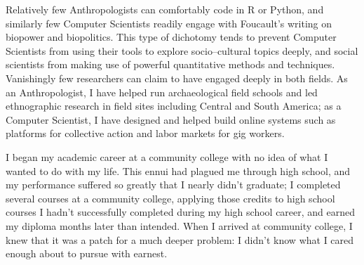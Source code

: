 \documentclass[12pt]{article}
\begin{document}




Relatively few Anthropologists can comfortably code in R or Python,
and similarly few Computer Scientists readily engage with Foucault's writing on biopower and biopolitics.
This type of dichotomy tends to prevent Computer Scientists from using their tools to explore socio--cultural topics deeply,
and social scientists from making use of powerful quantitative methods and techniques.
Vanishingly few researchers can claim to have engaged deeply in both fields.
As an Anthropologist, I have helped run archaeological field schools and led ethnographic research in field sites including Central and South America;
as a Computer Scientist, I have designed and helped build online systems such as platforms for collective action and labor markets for gig workers.








I began my academic career at a community college with no idea of what I wanted to do with my life.
This ennui had plagued me through high school,
and my performance suffered so greatly that I nearly didn't graduate;
I completed several courses at a community college,
applying those credits to high school courses I hadn't successfully completed during my high school career,
and earned my diploma months later than intended.
When I arrived at community college,
I knew that it was a patch for a much deeper problem:
I didn't know what I cared enough about to pursue with earnest.
\end{document}
